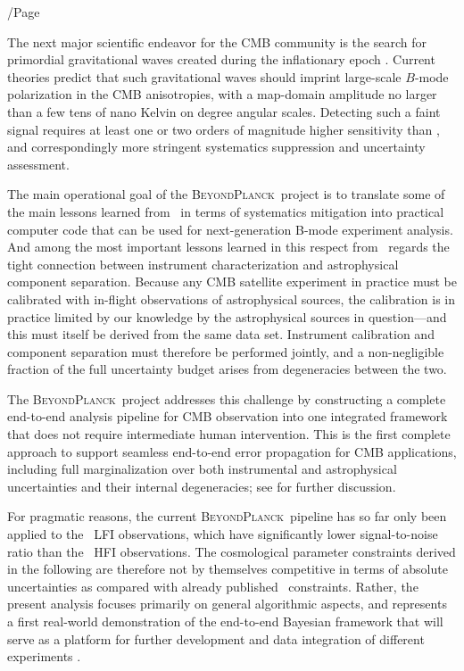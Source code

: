 /Page\documentclass[twocolumn]{aa}
\newcommand{\BP}{\textsc{BeyondPlanck}}
\begin{document}
The next major scientific endeavor for the CMB community is the
search for primordial gravitational waves created during the
inflationary epoch \citep[e.g.,][]{kamionkowski:2016}. Current theories predict that such gravitational
waves should imprint large-scale $B$-mode polarization in the CMB
anisotropies, with a map-domain amplitude no larger than a few tens of
nano Kelvin on degree angular scales. Detecting such a faint signal
requires at least one or two orders of magnitude higher sensitivity
than \Planck, and correspondingly more stringent systematics
suppression and uncertainty assessment.

The main operational goal of the \BP\ project \citep{bp01} is to
translate some of the main lessons learned from \Planck\ in terms of
systematics mitigation into practical computer code that can be used
for next-generation B-mode experiment analysis. And among the most
important lessons learned in this respect from \Planck\ regards the
tight connection between instrument characterization and astrophysical
component separation. Because any CMB satellite experiment in practice
must be calibrated with in-flight observations of astrophysical
sources, the calibration is in practice limited by our knowledge by
the astrophysical sources in question---and this must itself be
derived from the same data set. Instrument calibration and component
separation must therefore be performed jointly, and a non-negligible
fraction of the full uncertainty budget arises from degeneracies
between the two.

The \BP\ project addresses this challenge by constructing a complete
end-to-end analysis pipeline for CMB observation into one integrated
framework that does not require intermediate human intervention. This
is the first complete approach to support seamless end-to-end error
propagation for CMB applications, including full marginalization over
both instrumental and astrophysical uncertainties and their
internal degeneracies; see \citet{bp01,bp11} for further discussion.

For pragmatic reasons, the current \BP\ pipeline has so far only been
applied to the \Planck\ LFI observations, which have significantly
lower signal-to-noise ratio than the \Planck\ HFI observations. The
cosmological parameter constraints derived in the following are
therefore not by themselves competitive in terms of absolute
uncertainties as compared with already published
\Planck\ constraints. Rather, the present analysis focuses primarily
on general algorithmic aspects, and represents a first real-world
demonstration of the end-to-end Bayesian framework that will serve as
a platform for further development and data integration of different
experiments \citep{bp05}.
\end{document}
